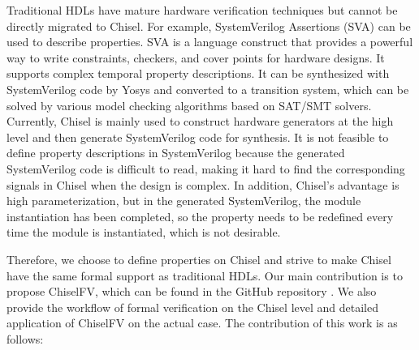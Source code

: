 \documentclass[conference]{IEEEtran}
\theoremstyle{definition}
\begin{document}
Traditional HDLs have mature hardware verification techniques but cannot be directly migrated to Chisel.
For example, SystemVerilog Assertions (SVA) \cite{vijayaraghavan2005practical} can be used to describe properties. SVA is a language construct that provides a powerful way to write constraints, checkers, and cover points for hardware designs. It supports complex temporal property descriptions. It can be synthesized with SystemVerilog code by Yosys \cite{wolf2016yosys} and converted to a transition system, which can be solved by various model checking algorithms based on SAT/SMT solvers.
Currently, Chisel is mainly used to construct hardware generators at the high level and then generate SystemVerilog code for synthesis. It is not feasible to define property descriptions in SystemVerilog because the generated SystemVerilog code is difficult to read, making it hard to find the corresponding signals in Chisel when the design is complex. In addition, Chisel's advantage is high parameterization, but in the generated SystemVerilog, the module instantiation has been completed, so the property needs to be redefined every time the module is instantiated, which is not desirable.

Therefore, we choose to define properties on Chisel and strive to make Chisel have the same formal support as traditional HDLs. 
Our main contribution is to propose ChiselFV, which can be found in the GitHub repository \cite{ChiselFV}.
We also provide the workflow of formal verification on the Chisel level and detailed application of ChiselFV on the actual case. The contribution of this work is as follows:
\end{document}
